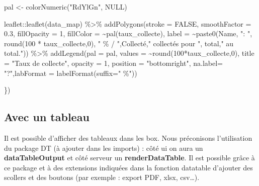 \documentclass[
  letterpaper,
  DIV=11,
  numbers=noendperiod]{scrreprt}
\newenvironment{Shaded}{\begin{snugshade}}{\end{snugshade}}
\newcommand{\AttributeTok}[1]{\textcolor[rgb]{0.40,0.45,0.13}{#1}}
\newcommand{\ConstantTok}[1]{\textcolor[rgb]{0.56,0.35,0.01}{#1}}
\newcommand{\DecValTok}[1]{\textcolor[rgb]{0.68,0.00,0.00}{#1}}
\newcommand{\FloatTok}[1]{\textcolor[rgb]{0.68,0.00,0.00}{#1}}
\newcommand{\FunctionTok}[1]{\textcolor[rgb]{0.28,0.35,0.67}{#1}}
\newcommand{\NormalTok}[1]{\textcolor[rgb]{0.00,0.23,0.31}{#1}}
\newcommand{\OtherTok}[1]{\textcolor[rgb]{0.00,0.23,0.31}{#1}}
\newcommand{\SpecialCharTok}[1]{\textcolor[rgb]{0.37,0.37,0.37}{#1}}
\newcommand{\StringTok}[1]{\textcolor[rgb]{0.13,0.47,0.30}{#1}}
\begin{document}
\begin{Shaded}
\begin{Highlighting}[]
\NormalTok{        pal }\OtherTok{\textless{}{-}} \FunctionTok{colorNumeric}\NormalTok{(}\StringTok{"RdYlGn"}\NormalTok{, }\ConstantTok{NULL}\NormalTok{)}

\NormalTok{        leaflet}\SpecialCharTok{::}\FunctionTok{leaflet}\NormalTok{(data\_map) }\SpecialCharTok{\%\textgreater{}\%}
          \FunctionTok{addPolygons}\NormalTok{(}\AttributeTok{stroke =} \ConstantTok{FALSE}\NormalTok{, }
              \AttributeTok{smoothFactor =} \FloatTok{0.3}\NormalTok{, }
              \AttributeTok{fillOpacity =} \DecValTok{1}\NormalTok{,}
              \AttributeTok{fillColor =} \SpecialCharTok{\textasciitilde{}}\FunctionTok{pal}\NormalTok{(taux\_collecte),}
              \AttributeTok{label =} \SpecialCharTok{\textasciitilde{}}\FunctionTok{paste0}\NormalTok{(Name, }\StringTok{": "}\NormalTok{,}
                              \FunctionTok{round}\NormalTok{(}\DecValTok{100} \SpecialCharTok{*}\NormalTok{ taux\_collecte,}\DecValTok{0}\NormalTok{),}
                              \StringTok{" \% / "}\NormalTok{,Collecté,}\StringTok{" collectés pour "}\NormalTok{, total,}\StringTok{" au total."}\NormalTok{)) }\SpecialCharTok{\%\textgreater{}\%}
              \FunctionTok{addLegend}\NormalTok{(}\AttributeTok{pal =}\NormalTok{ pal, }\AttributeTok{values =} \SpecialCharTok{\textasciitilde{}}\FunctionTok{round}\NormalTok{(}\DecValTok{100}\SpecialCharTok{*}\NormalTok{taux\_collecte,}\DecValTok{0}\NormalTok{), }\AttributeTok{title =} \StringTok{"Taux de collecte"}\NormalTok{,}
                    \AttributeTok{opacity =} \DecValTok{1}\NormalTok{, }\AttributeTok{position =} \StringTok{"bottomright"}\NormalTok{, }\AttributeTok{na.label=} \StringTok{"?"}\NormalTok{,}\AttributeTok{labFormat =} \FunctionTok{labelFormat}\NormalTok{(}\AttributeTok{suffix=}\StringTok{" \%"}\NormalTok{))}

\NormalTok{    \})}
\end{Highlighting}
\end{Shaded}

\hypertarget{avec-un-tableau}{%
\subsection{Avec un tableau}\label{avec-un-tableau}}

Il est possible d'afficher des tableaux dans les box. Nous préconisons
l'utilisation du package DT (à ajouter dans les imports) : côté ui on
aura un \textbf{dataTableOutput} et côté serveur un
\textbf{renderDataTable}. Il est possible grâce à ce package et à des
extensions indiquées dans la fonction datatable d'ajouter des scollers
et des boutons (par exemple : export PDF, xlsx, csv\ldots).
\end{document}

